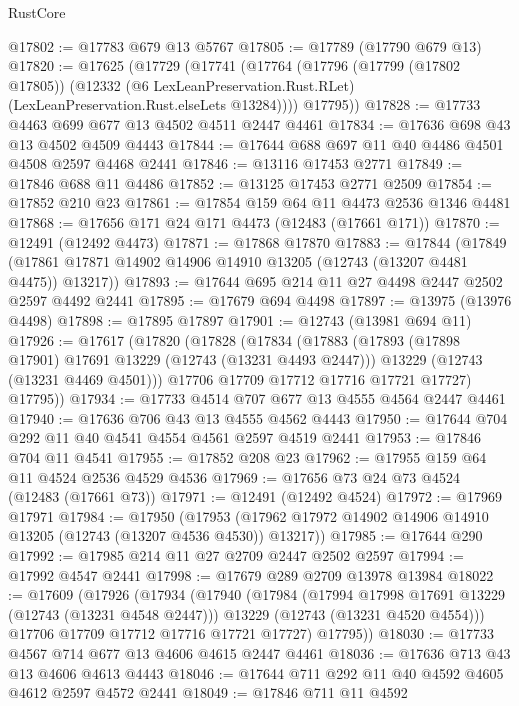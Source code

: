 \begin{lexlean}{RustCore}
\begin{coremodule}
@17802 := @17783 @679 @13 @5767
@17805 := @17789 (@17790 @679 @13)
@17820 := @17625
    (@17729
      (@17741
        (@17764
          (@17796
            (@17799 (@17802 @17805))
            (@12332 (@6 LexLeanPreservation.Rust.RLet) (LexLeanPreservation.Rust.elseLets @13284))))
        @17795))
@17828 := @17733 @4463 @699 @677 @13 @4502 @4511 @2447 @4461
@17834 := @17636 @698 @43 @13 @4502 @4509 @4443
@17844 := @17644 @688 @697 @11 @40 @4486 @4501 @4508 @2597 @4468 @2441
@17846 := @13116 @17453 @2771
@17849 := @17846 @688 @11 @4486
@17852 := @13125 @17453 @2771 @2509
@17854 := @17852 @210 @23
@17861 := @17854 @159 @64 @11 @4473 @2536 @1346 @4481
@17868 := @17656 @171 @24 @171 @4473 (@12483 (@17661 @171))
@17870 := @12491 (@12492 @4473)
@17871 := @17868 @17870
@17883 := @17844
    (@17849 (@17861 @17871 @14902 @14906 @14910 @13205 (@12743 (@13207 @4481 @4475)) @13217))
@17893 := @17644 @695 @214 @11 @27 @4498 @2447 @2502 @2597 @4492 @2441
@17895 := @17679 @694 @4498
@17897 := @13975 (@13976 @4498)
@17898 := @17895 @17897
@17901 := @12743 (@13981 @694 @11)
@17926 := @17617
    (@17820
      (@17828
        (@17834
          (@17883
            (@17893 (@17898 @17901) @17691 @13229 (@12743 (@13231 @4493 @2447)))
            @13229
            (@12743 (@13231 @4469 @4501)))
          @17706
          @17709
          @17712
          @17716
          @17721
          @17727)
        @17795))
@17934 := @17733 @4514 @707 @677 @13 @4555 @4564 @2447 @4461
@17940 := @17636 @706 @43 @13 @4555 @4562 @4443
@17950 := @17644 @704 @292 @11 @40 @4541 @4554 @4561 @2597 @4519 @2441
@17953 := @17846 @704 @11 @4541
@17955 := @17852 @208 @23
@17962 := @17955 @159 @64 @11 @4524 @2536 @4529 @4536
@17969 := @17656 @73 @24 @73 @4524 (@12483 (@17661 @73))
@17971 := @12491 (@12492 @4524)
@17972 := @17969 @17971
@17984 := @17950
    (@17953 (@17962 @17972 @14902 @14906 @14910 @13205 (@12743 (@13207 @4536 @4530)) @13217))
@17985 := @17644 @290
@17992 := @17985 @214 @11 @27 @2709 @2447 @2502 @2597
@17994 := @17992 @4547 @2441
@17998 := @17679 @289 @2709 @13978 @13984
@18022 := @17609
    (@17926
      (@17934
        (@17940
          (@17984
            (@17994 @17998 @17691 @13229 (@12743 (@13231 @4548 @2447)))
            @13229
            (@12743 (@13231 @4520 @4554)))
          @17706
          @17709
          @17712
          @17716
          @17721
          @17727)
        @17795))
@18030 := @17733 @4567 @714 @677 @13 @4606 @4615 @2447 @4461
@18036 := @17636 @713 @43 @13 @4606 @4613 @4443
@18046 := @17644 @711 @292 @11 @40 @4592 @4605 @4612 @2597 @4572 @2441
@18049 := @17846 @711 @11 @4592

\end{coremodule}
\end{lexlean}

